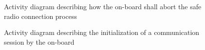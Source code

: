 \documentclass{template/openetcs_report}
\begin{document}
\begin{figure}
  \centering
  \caption{Activity diagram describing how the on-board shall abort the safe radio connection process}
  \label{fig:StopSafeRadioConnectProc}
\end{figure}

\begin{figure}
  \centering
  \caption{Activity diagram describing the initialization of a communication session by the on-board}
  \label{fig:Initiate_comm_session}
\end{figure}
\end{document}

